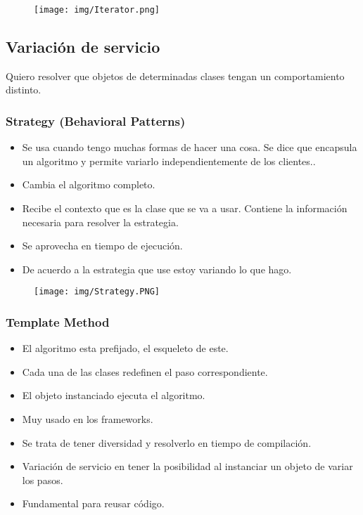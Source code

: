 \begin{figure}[!htb]
    \centering
    \texttt{[image: img/Iterator.png]}
\end{figure}


\subsection*{Variación de servicio}
Quiero resolver que objetos de determinadas clases tengan un comportamiento distinto.


\subsubsection*{Strategy (Behavioral Patterns)} 
\begin{itemize}
\item Se usa cuando tengo muchas formas de hacer una cosa. Se dice que encapsula un algoritmo y permite variarlo independientemente de los clientes..
\item Cambia el algoritmo completo.
\item Recibe el contexto que es la clase que se va a usar. Contiene la información necesaria para resolver la estrategia.
\item Se aprovecha en tiempo de ejecución.
\item De acuerdo a la estrategia que use estoy variando lo que hago.
\end{itemize}


\begin{figure}[!htb]
    \centering
    \texttt{[image: img/Strategy.PNG]}
\end{figure}


\subsubsection*{Template Method}
\begin{itemize}
\item El algoritmo esta prefijado, el esqueleto de este.
\item Cada una de las clases redefinen el paso correspondiente.
\item El objeto instanciado ejecuta el algoritmo.
\item Muy usado en los frameworks.
\item Se trata de tener diversidad y resolverlo en tiempo de compilación.
\item Variación de servicio en tener la posibilidad al instanciar un objeto de variar los pasos.
\item Fundamental para reusar código.
\end{itemize}


